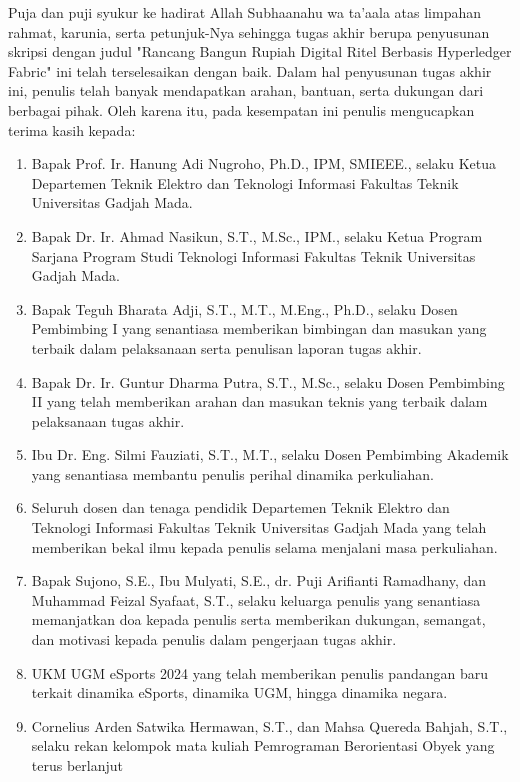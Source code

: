 Puja dan puji syukur ke hadirat Allah Subhaanahu wa ta’aala atas limpahan
rahmat, karunia, serta petunjuk-Nya sehingga tugas akhir berupa penyusunan skripsi
dengan judul "Rancang Bangun Rupiah Digital Ritel Berbasis Hyperledger Fabric" ini telah terselesaikan dengan baik. Dalam hal
penyusunan tugas akhir ini, penulis telah banyak mendapatkan arahan, bantuan, serta
dukungan dari berbagai pihak.
Oleh karena itu, pada kesempatan ini penulis
mengucapkan terima kasih kepada:

\begin{enumerate}
	\item Bapak Prof. Ir. Hanung Adi Nugroho, Ph.D., IPM, SMIEEE., selaku Ketua
	      Departemen Teknik Elektro dan Teknologi Informasi Fakultas Teknik Universitas
	      Gadjah Mada.
	\item Bapak Dr. Ir. Ahmad Nasikun, S.T., M.Sc., IPM., selaku Ketua Program Sarjana
	      Program Studi Teknologi Informasi Fakultas Teknik Universitas Gadjah Mada.
	\item Bapak Teguh Bharata Adji, S.T., M.T., M.Eng., Ph.D., selaku Dosen Pembimbing I
	      yang senantiasa memberikan bimbingan dan masukan yang terbaik dalam
	      pelaksanaan serta penulisan laporan tugas akhir.
	\item Bapak Dr. Ir. Guntur Dharma Putra, S.T., M.Sc., selaku Dosen Pembimbing II
	      yang telah memberikan arahan dan masukan teknis yang terbaik dalam pelaksanaan
	      tugas akhir.
	\item Ibu Dr. Eng. Silmi Fauziati, S.T., M.T., selaku Dosen Pembimbing Akademik yang
	      senantiasa membantu penulis perihal dinamika perkuliahan.
	\item Seluruh dosen dan tenaga pendidik Departemen Teknik Elektro dan Teknologi Informasi
	      Fakultas Teknik Universitas Gadjah Mada yang telah memberikan bekal
	      ilmu kepada penulis selama menjalani masa perkuliahan.
	\item Bapak Sujono, S.E., Ibu Mulyati, S.E., dr. Puji Arifianti Ramadhany, dan
	      Muhammad Feizal Syafaat, S.T., selaku keluarga penulis yang senantiasa
	      memanjatkan doa kepada penulis serta memberikan dukungan, semangat, dan motivasi
	      kepada penulis dalam pengerjaan tugas akhir.
	\item UKM UGM eSports 2024 yang telah memberikan penulis pandangan baru terkait dinamika
	      eSports, dinamika UGM, hingga dinamika negara.
	\item Cornelius Arden Satwika Hermawan, S.T., dan Mahsa Quereda Bahjah, S.T., selaku
	      rekan kelompok mata kuliah Pemrograman Berorientasi Obyek yang terus berlanjut

\end{enumerate}

